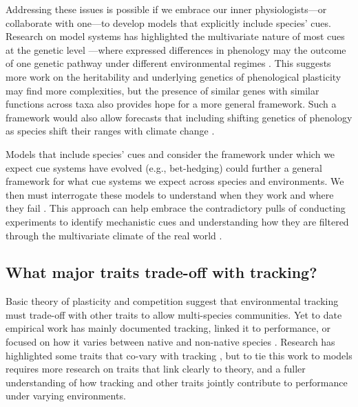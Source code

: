 \documentclass[11pt,letterpaper]{article}
\begin{document}
Addressing these issues is possible if we embrace our inner physiologists---or collaborate with one---to develop models that explicitly include species' cues. Research on model systems has highlighted the multivariate nature of most cues at the genetic level \citep{Wilczek:2010ad}---where expressed differences in phenology may the outcome of one genetic pathway under different environmental regimes \citep{Stinchcombe:2004e,Wilczek:2009oa,chang2021}. This suggests more work on the heritability and underlying genetics of phenological plasticity may find more complexities, but the presence of similar genes with similar functions across taxa \citep{Wilczek:2010ad,chang2021} also provides hope for a more general framework. Such a framework would also allow forecasts that including shifting genetics of phenology as species shift their ranges with climate change \citep[e.g.,][]{lusten2018}. 

Models that include species' cues and consider the framework under which we expect cue systems have evolved (e.g., bet-hedging) could further a general framework for what cue systems we expect across species and environments. We then must interrogate these models to understand when they work and where they fail \citep[see][for an example]{johanOCR}. This approach can help embrace the contradictory pulls of conducting experiments to identify mechanistic cues and understanding how they are filtered through the multivariate climate of the real world \citep[see][]{Wilczek:2010ad,Wilczek:2009oa}.


\subsection{What major traits trade-off with tracking?} 
Basic theory of plasticity and competition suggest that environmental tracking must trade-off with other traits to allow multi-species communities. Yet to date empirical work has mainly documented tracking, linked it to performance, or focused on how it varies between native and non-native species \citep{Willis:2010al,wolkovichAmBot2013,Zettlemoyer2019}. Research has highlighted some traits that co-vary with tracking \citep[e.g.,][]{kharouba2014,lasky2016,Zhu2016BioLetters}, but to tie this work to models requires more research on traits that link clearly to theory, and a fuller understanding of how tracking and other traits jointly contribute to performance under varying environments. 
\end{document}
